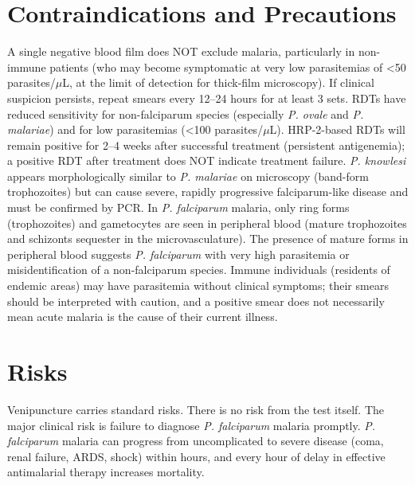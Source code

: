 \section*{Contraindications and Precautions}
A single negative blood film does NOT exclude malaria, particularly in non-immune patients (who may become symptomatic at very low parasitemias of <50 parasites/$\mu$L, at the limit of detection for thick-film microscopy). If clinical suspicion persists, repeat smears every 12--24 hours for at least 3 sets. RDTs have reduced sensitivity for non-falciparum species (especially \textit{P. ovale} and \textit{P. malariae}) and for low parasitemias (<100 parasites/$\mu$L). HRP-2-based RDTs will remain positive for 2--4 weeks after successful treatment (persistent antigenemia); a positive RDT after treatment does NOT indicate treatment failure. \textit{P. knowlesi} appears morphologically similar to \textit{P. malariae} on microscopy (band-form trophozoites) but can cause severe, rapidly progressive falciparum-like disease and must be confirmed by PCR. In \textit{P. falciparum} malaria, only ring forms (trophozoites) and gametocytes are seen in peripheral blood (mature trophozoites and schizonts sequester in the microvasculature). The presence of mature forms in peripheral blood suggests \textit{P. falciparum} with very high parasitemia or misidentification of a non-falciparum species. Immune individuals (residents of endemic areas) may have parasitemia without clinical symptoms; their smears should be interpreted with caution, and a positive smear does not necessarily mean acute malaria is the cause of their current illness.

\section*{Risks}
Venipuncture carries standard risks. There is no risk from the test itself. The major clinical risk is failure to diagnose \textit{P. falciparum} malaria promptly. \textit{P. falciparum} malaria can progress from uncomplicated to severe disease (coma, renal failure, ARDS, shock) within hours, and every hour of delay in effective antimalarial therapy increases mortality.

